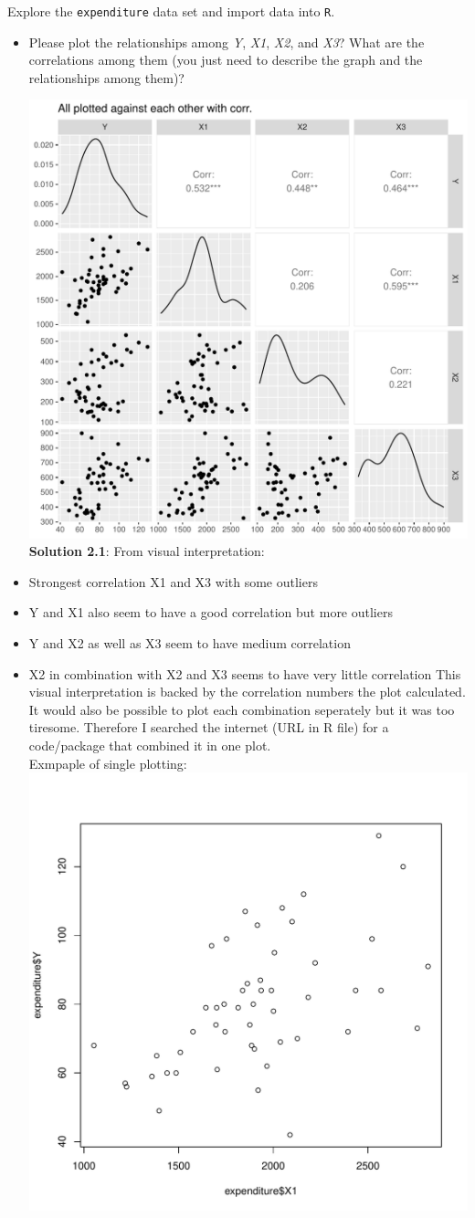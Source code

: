\documentclass[12pt,letterpaper]{article}
\begin{document}
\vspace{.5cm}
\noindent Explore the \texttt{expenditure} data set and import data into \texttt{R}.
\vspace{.5cm}
\vspace{.5cm}
\begin{itemize}

\item
Please plot the relationships among \emph{Y}, \emph{X1}, \emph{X2}, and \emph{X3}? What are the correlations among them (you just need to describe the graph and the relationships among them)?
\vspace{.5cm}

\includegraphics[width=.50\textwidth]{plot2.pdf} \\

\textbf{Solution 2.1}: From visual interpretation: 
\item Strongest correlation X1 and X3 with some outliers
\item Y and X1 also seem to have a good correlation but more outliers
\item Y and X2 as well as X3 seem to have medium correlation
\item X2 in combination with X2 and X3 seems to have very little correlation
This visual interpretation is backed by the correlation numbers the plot calculated. \\

It would also be possible to plot each combination seperately but it was too tiresome. Therefore I searched the internet (URL in R file) for a code/package that combined it in one plot.\\
Exmpaple of single plotting:\\
\includegraphics[width=.50\textwidth]{plot1.pdf} \\


\end{itemize}
\end{document}
